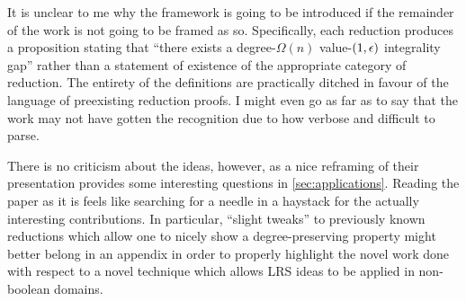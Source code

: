 \documentclass[runningheads,a4paper,english]{llncs}[2022/01/12]
\begin{document}
It is unclear to me why the framework is going to be introduced if the remainder of the work is not going to be framed as so.
Specifically, each reduction produces a proposition stating that ``there exists a degree-$\Omega(n)$ value-$(1,\epsilon)$ integrality gap'' rather than a statement of existence of the appropriate category of reduction.
The entirety of the definitions are practically ditched in favour of the language of preexisting reduction proofs.
I might even go as far as to say that the work may not have gotten the recognition due to how verbose and difficult to parse.

There is no criticism about the ideas, however, as a nice reframing of their presentation provides some interesting questions in \cref{sec:applications}.
Reading the paper as it is feels like searching for a needle in a haystack for the actually interesting contributions.
In particular, ``slight tweaks'' to previously known reductions which allow one to nicely show a degree-preserving property might better belong in an appendix in order to properly highlight the novel work done with respect to a novel technique which allows LRS ideas to be applied in non-boolean domains.





\end{document}
